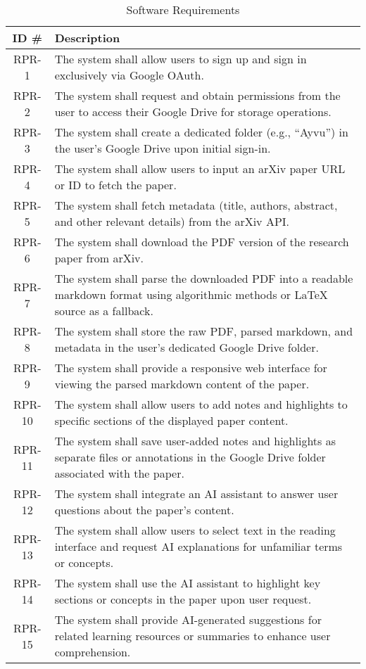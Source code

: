 \documentclass[12pt]{article}
\begin{document}
\begin{table}[htbp]
  \centering
  \caption{Software Requirements}
  \label{tab:software-requirements}
  \begin{tabular}{|c|p{15cm}|}
    \hline
    \textbf{ID \#} & \textbf{Description} \\
    \hline
    RPR-1 & The system shall allow users to sign up and sign in exclusively via Google OAuth. \\
    \hline
    RPR-2 & The system shall request and obtain permissions from the user to access their Google Drive for storage operations. \\
    \hline
    RPR-3 & The system shall create a dedicated folder (e.g., ``Ayvu'') in the user's Google Drive upon initial sign-in. \\
    \hline
    RPR-4 & The system shall allow users to input an arXiv paper URL or ID to fetch the paper. \\
    \hline
    RPR-5 & The system shall fetch metadata (title, authors, abstract, and other relevant details) from the arXiv API. \\
    \hline
    RPR-6 & The system shall download the PDF version of the research paper from arXiv. \\
    \hline
    RPR-7 & The system shall parse the downloaded PDF into a readable markdown format using algorithmic methods or LaTeX source as a fallback. \\
    \hline
    RPR-8 & The system shall store the raw PDF, parsed markdown, and metadata in the user's dedicated Google Drive folder. \\
    \hline
    RPR-9 & The system shall provide a responsive web interface for viewing the parsed markdown content of the paper. \\
    \hline
    RPR-10 & The system shall allow users to add notes and highlights to specific sections of the displayed paper content. \\
    \hline
    RPR-11 & The system shall save user-added notes and highlights as separate files or annotations in the Google Drive folder associated with the paper. \\
    \hline
    RPR-12 & The system shall integrate an AI assistant to answer user questions about the paper's content. \\
    \hline
    RPR-13 & The system shall allow users to select text in the reading interface and request AI explanations for unfamiliar terms or concepts. \\
    \hline
    RPR-14 & The system shall use the AI assistant to highlight key sections or concepts in the paper upon user request. \\
    \hline
    RPR-15 & The system shall provide AI-generated suggestions for related learning resources or summaries to enhance user comprehension. \\
    \hline
  \end{tabular}
\end{table}
\end{document}
